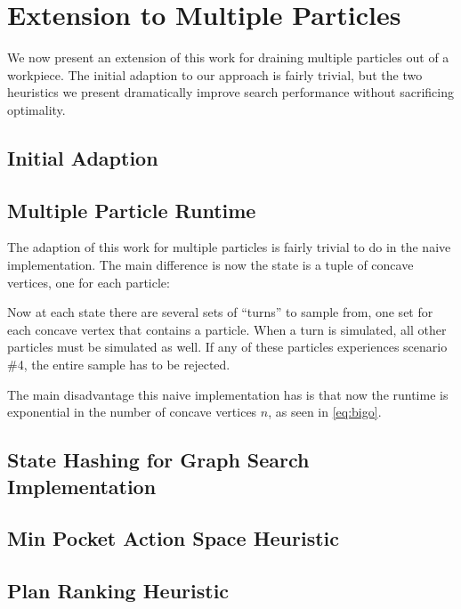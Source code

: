 \chapter{Extension to Multiple Particles}

We now present an extension of this work for draining multiple particles out of a workpiece. The initial adaption to our approach is fairly trivial, but the two heuristics we present dramatically improve search performance without sacrificing optimality.

\section{Initial Adaption}




\section{Multiple Particle Runtime}

The adaption of this work for multiple particles is fairly trivial to do in the naive implementation. The main difference is now the state is a tuple of concave vertices, one for each particle:

 {
  \label{eq:multipleParticleStateSpace}
}

Now at each state there are several sets of ``turns'' to sample from, one set for each concave vertex that contains a particle. When a turn is simulated, all other particles must be simulated as well. If any of these particles experiences scenario \#4, the entire sample has to be rejected.

The main disadvantage this naive implementation has is that now the runtime is exponential in the number of concave vertices $n$, as seen in \eqref{eq:bigo}.

 {
  \label{eq:bigoTotal}
}

\section{State Hashing for Graph Search Implementation}


\section{Min Pocket Action Space Heuristic}


\section{Plan Ranking Heuristic}



